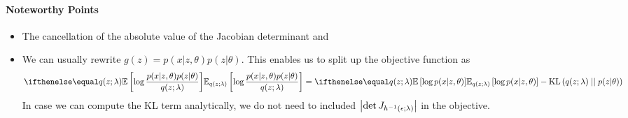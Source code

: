 \documentclass[a4paper,11pt]{article}
\begin{document}
\paragraph{Noteworthy Points}
\begin{itemize}
\item The cancellation of the absolute value of the Jacobian determinant and 
\item We can usually rewrite $ g(z) = p(x|z, \theta)p(z|\theta) $. This enables us to split up the objective function as
\begin{equation}
\E[q(z;\lambda)]{\log \dfrac{p(x|z, \theta)p(z|\theta)}{q(z;\lambda)}} = \E[q(z;\lambda)]{\log p(x|z, \theta)} - \KL{q(z;\lambda)}{p(z|\theta)}
\end{equation}
In case we can compute the KL term analytically, we do not need to included $\abs{\det J_{h^{-1}(\epsilon; \lambda)}}$ in the objective. 
\end{itemize}



\end{document}
